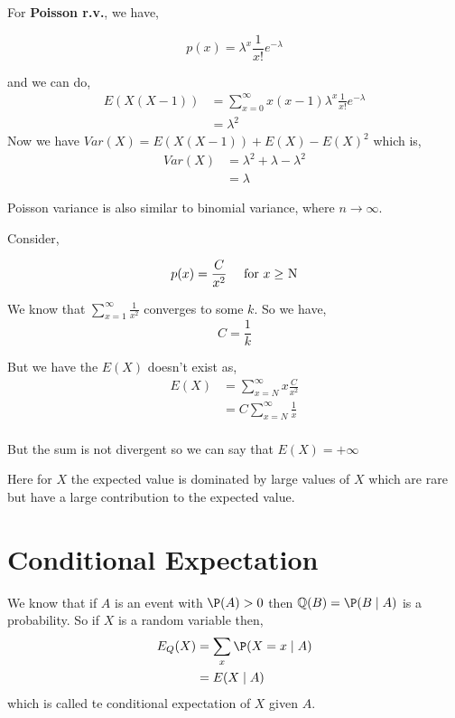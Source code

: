 \begin{eg}
	For \textbf{Poisson r.v.}, we have, 
	
	$$ p(x) = \lambda^{x} \frac{1}{x!} e^{-\lambda} $$ 

	and we can do,
	\begin{align*}
		E(X(X - 1)) &= \sum_{x=0}^{\infty} x(x - 1) \lambda^{x} \frac{1}{x!} e^{-\lambda} \\
		            &= \lambda^2
	\end{align*}
	Now we have $Var(X) = E(X(X - 1)) + E(X) - E(X)^2$ which is,
	\begin{align*}
		Var(X) &= \lambda^2 + \lambda - \lambda^2 \\
		       &= \lambda
	\end{align*}
\end{eg}
\begin{remark}
	Poisson variance is also similar to binomial variance, where $n \to \infty$.
\end{remark}


Consider, 
\begin{eg}
	
	$$ p(x) = \frac{C}{x^2} \quad \text{ for $ x \ge$ N} $$ 

	We know that $\sum_{x=1}^{\infty} \frac{1}{x^2}$ converges to some $k$. So we have,
	$$ C = \frac{1}{k} $$

	But we have the $E(X)$ doesn't exist as, 
	 \begin{align*}
		 E(X) &= \sum_{x=N}^{\infty} x \frac{C}{x^2} \\
		      &= C \sum_{x=N}^{\infty} \frac{1}{x} \\
	\end{align*}

	But the sum is not divergent so we can say that $E(X) = +\infty$
	
	 \vspace{1em}
	
	 Here for $X$ the expected value is dominated by large values of $X$ which are rare but have a large contribution to the expected value.
\end{eg}

\section{Conditional Expectation}
\begin{definition}
	We know that if $A$ is an event with $\P(A) > 0$ then  $\Q(B) = \P(B \mid A)$ is a probability. So if $X$ is a random variable then,
	\begin{align*}
		E_Q(X) &= \sum_{x} \P(X = x \mid A)\\
		       &= E(X \mid A)
	\end{align*}
	which is called te conditional expectation of $X$ given $A$.
\end{definition}

